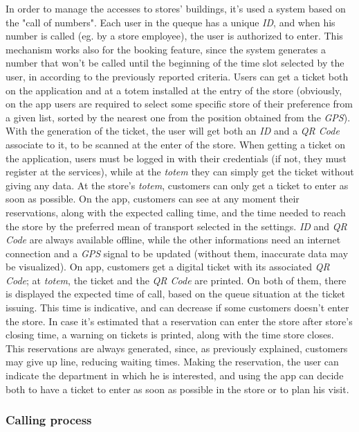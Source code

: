 \documentclass{article}
\begin{document}
		In order to manage the accesses to stores' buildings, it's used a system based on the "call of numbers". Each user in the queque has a unique \emph{ID}, and when his number is called (eg. by a store employee), the user is authorized to enter. This mechanism works also for the booking feature, since the system generates a number that won't be called until the beginning of the time slot selected by the user, in according to the previously reported criteria. Users can get a ticket both on the application and at a totem installed at the entry of the store (obviously, on the app users are required to select some specific store of their preference from a given list, sorted by the nearest one from the position obtained from the \emph{GPS}). With the generation of the ticket, the user will get both an \emph{ID} and a \emph{QR Code} associate to it, to be scanned at the enter of the store. When getting a ticket on the application, users must be logged in with their credentials (if not, they must register at the services), while at the \emph{totem} they can simply get the ticket without giving any data. At the store's \emph{totem}, customers can only get a ticket to enter as soon as possible. On the app, customers can see at any moment their reservations, along with the expected calling time, and the time needed to reach the store by the preferred mean of transport selected in the settings. \emph{ID} and \emph{QR Code} are always available offline, while the other informations need an internet connection and a \emph{GPS} signal to be updated (without them, inaccurate data may be visualized). On app, customers get a digital ticket with its associated \emph{QR Code}; at \emph{totem}, the ticket and the \emph{QR Code} are printed. On both of them, there is displayed the expected time of call, based on the queue situation at the ticket issuing. This time is indicative, and can decrease if some customers doesn't enter the store. In case it's estimated that a reservation can enter the store after store's closing time, a warning on tickets is printed, along with the time store closes. This reservations are always generated, since, as previously explained, customers may give up line, reducing waiting times. Making the reservation, the user can indicate the department in which he is interested, and using the app can decide both to have a ticket to enter as soon as possible in the store or to plan his visit. 
		
		\subsubsection{Calling process}
		
\end{document}
